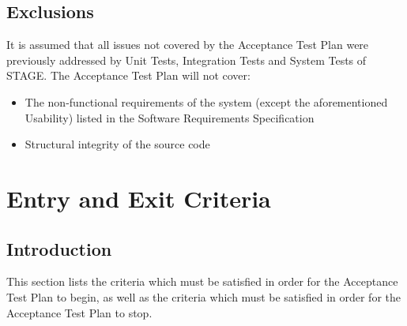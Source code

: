 \documentclass[titlepage]{article}
\begin{document}

\subsection{Exclusions}
    It is assumed that all issues not covered by the Acceptance Test Plan were previously addressed by Unit Tests, Integration Tests and System Tests of STAGE. The Acceptance Test Plan will not cover:
    \begin{itemize}   
        \item The non-functional requirements of the system (except the aforementioned Usability) listed in the Software Requirements Specification
        \item Structural integrity of the source code
    \end{itemize}


\section{Entry and Exit Criteria%
    \label{criteria}%
}


\subsection{Introduction}
    This section lists the criteria which must be satisfied in order for the Acceptance Test Plan to begin, as well as the criteria which must be satisfied in order for the Acceptance Test Plan to stop.

\end{document}
